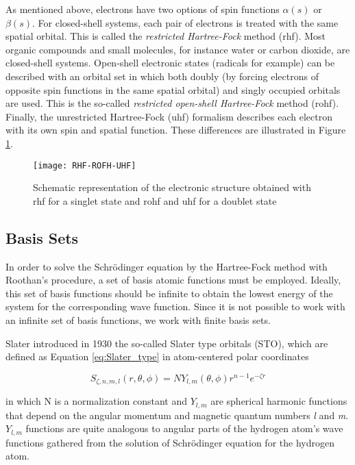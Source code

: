 \begin{refsection}
As mentioned above, electrons have two options of spin functions $\alpha(s)$ or  $\beta(s)$. For closed-shell systems, each pair of electrons is treated with the same spatial orbital. This is called the \textit{restricted Hartree-Fock} method (\acrshort{rhf}). Most organic compounds and small molecules, for instance water or carbon dioxide, are closed-shell systems. Open-shell electronic states (radicals for example) can be described with an orbital set in which both doubly (by forcing electrons of opposite spin functions in the same spatial orbital) and singly occupied orbitals are used. This is the so-called \textit{restricted open-shell Hartree-Fock} method (\acrshort{rohf}). Finally, the unrestricted Hartree-Fock (\acrshort{uhf}) formalism describes each electron with its own spin and spatial function. These differences are illustrated in Figure \ref{fig:RHF_UHF}.

\begin{figure}[htb!]
	\centering
	\texttt{[image: RHF-ROFH-UHF]}
	\caption{Schematic representation of the electronic structure obtained with \acrshort{rhf} for a singlet state and \acrshort{rohf} and \acrshort{uhf} for a doublet state}
	\label{fig:RHF_UHF}
\end{figure}

\subsection{Basis Sets}

In order to solve the Schr\"odinger equation by the Hartree-Fock method with Root\-han's procedure,\cite{c1:22:Lewars2011} a set of basis atomic functions must be employed. Ideally, this set of basis functions should be infinite to obtain the lowest energy of the system for the corresponding wave function. Since it is not possible to work with an infinite set of basis functions, we work with finite basis sets.

Slater introduced in 1930 the so-called Slater type orbitals (STO),\cite{c1:slater1930} which are defined as Equation \ref{eq:Slater_type} in atom-centered polar coordinates

\begin{equation}
S_{\zeta,n,m,l}(r,\theta,\phi) = NY_{l,m}(\theta,\phi)r^{n-1}e^{-\zeta r}
\label{eq:Slater_type}
\end{equation}

\noindent in which N is a normalization constant and $Y_{l,m}$ are spherical harmonic functions that depend on the angular momentum and magnetic quantum numbers \textit{l} and \textit{m}. $Y_{l,m}$ functions are quite analogous to angular parts of the hydrogen atom's wave functions gathered from the solution of Schr\"odinger equation for the hydrogen atom.


\end{refsection}
